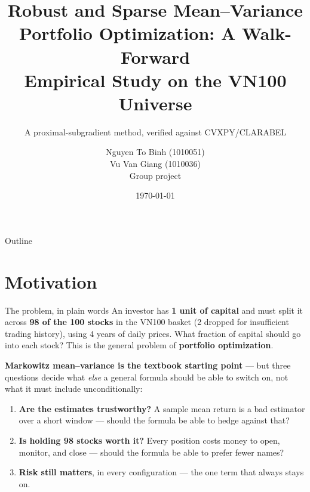 \documentclass[aspectratio=169]{beamer}
\title[Robust+Sparse Portfolio Opt.]{Robust and Sparse Mean--Variance\\Portfolio Optimization: A Walk-Forward\\Empirical Study on the VN100 Universe}
\subtitle{A proximal-subgradient method, verified against CVXPY/CLARABEL}
\author[Binh \& Giang]{Nguyen To Binh (1010051) \\ Vu Van Giang (1010036) \\ \small Group project}
\institute[]{Optimization \\ Instructor: Cai Yutong}
\date[\today]{\today}
\begin{document}
\begin{frame}
  \titlepage
\end{frame}

\begin{frame}{Outline}
  \tableofcontents
\end{frame}


\section{Motivation}

\begin{frame}{The problem, in plain words}
  An investor has \textbf{1 unit of capital} and must split it across \textbf{98 of the 100
  stocks} in the VN100 basket (2 dropped for insufficient trading history), using 4 years of
  daily prices. What fraction of capital should go into each stock? This is the general
  problem of \textbf{portfolio optimization}.

  \vspace{0.3cm}
  \textbf{Markowitz mean--variance is the textbook starting point} --- but three questions
  decide what \emph{else} a general formula should be able to switch on, not what it must
  include unconditionally:
  \begin{enumerate}
    \item<2-> \textbf{Are the estimates trustworthy?} A sample mean return is a bad estimator
          over a short window --- should the formula be able to hedge against that?
    \item<3-> \textbf{Is holding 98 stocks worth it?} Every position costs money to open,
          monitor, and close --- should the formula be able to prefer fewer names?
    \item<4-> \textbf{Risk still matters}, in every configuration --- the one term that always
          stays on.
  \end{enumerate}

  \vspace{0.3cm}
\end{frame}
\end{document}
